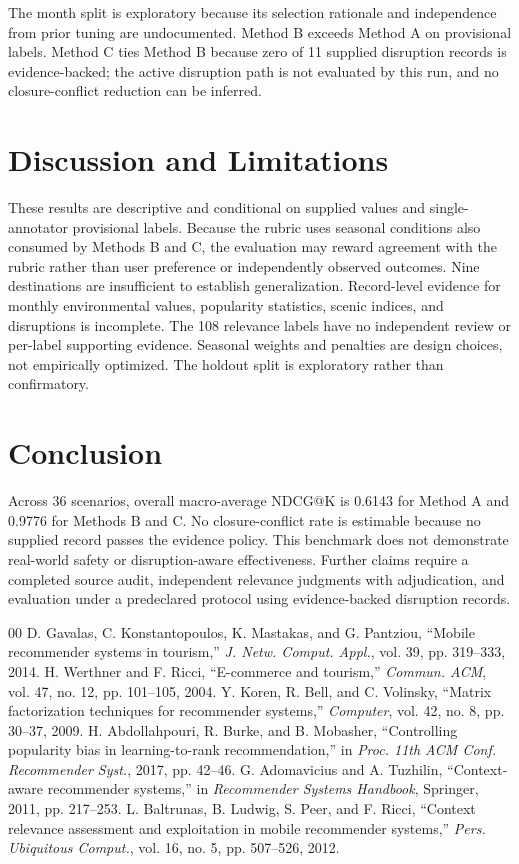 \documentclass[conference]{IEEEtran}
\begin{document}
The month split is exploratory because its selection rationale and independence from prior tuning are undocumented. Method B exceeds Method A on provisional labels. Method C ties Method B because zero of 11 supplied disruption records is evidence-backed; the active disruption path is not evaluated by this run, and no closure-conflict reduction can be inferred.

\section{Discussion and Limitations}
These results are descriptive and conditional on supplied values and single-annotator provisional labels. Because the rubric uses seasonal conditions also consumed by Methods B and C, the evaluation may reward agreement with the rubric rather than user preference or independently observed outcomes. Nine destinations are insufficient to establish generalization. Record-level evidence for monthly environmental values, popularity statistics, scenic indices, and disruptions is incomplete. The 108 relevance labels have no independent review or per-label supporting evidence. Seasonal weights and penalties are design choices, not empirically optimized. The holdout split is exploratory rather than confirmatory.

\section{Conclusion}
Across 36 scenarios, overall macro-average NDCG@K is 0.6143 for Method A and 0.9776 for Methods B and C. No closure-conflict rate is estimable because no supplied record passes the evidence policy. This benchmark does not demonstrate real-world safety or disruption-aware effectiveness. Further claims require a completed source audit, independent relevance judgments with adjudication, and evaluation under a predeclared protocol using evidence-backed disruption records.
\begin{thebibliography}{00}
 D. Gavalas, C. Konstantopoulos, K. Mastakas, and G. Pantziou, ``Mobile recommender systems in tourism,'' \textit{J. Netw. Comput. Appl.}, vol. 39, pp. 319--333, 2014.
 H. Werthner and F. Ricci, ``E-commerce and tourism,'' \textit{Commun. ACM}, vol. 47, no. 12, pp. 101--105, 2004.
 Y. Koren, R. Bell, and C. Volinsky, ``Matrix factorization techniques for recommender systems,'' \textit{Computer}, vol. 42, no. 8, pp. 30--37, 2009.
 H. Abdollahpouri, R. Burke, and B. Mobasher, ``Controlling popularity bias in learning-to-rank recommendation,'' in \textit{Proc. 11th ACM Conf. Recommender Syst.}, 2017, pp. 42--46.
 G. Adomavicius and A. Tuzhilin, ``Context-aware recommender systems,'' in \textit{Recommender Systems Handbook}, Springer, 2011, pp. 217--253.
 L. Baltrunas, B. Ludwig, S. Peer, and F. Ricci, ``Context relevance assessment and exploitation in mobile recommender systems,'' \textit{Pers. Ubiquitous Comput.}, vol. 16, no. 5, pp. 507--526, 2012.
\end{thebibliography}
\end{document}
